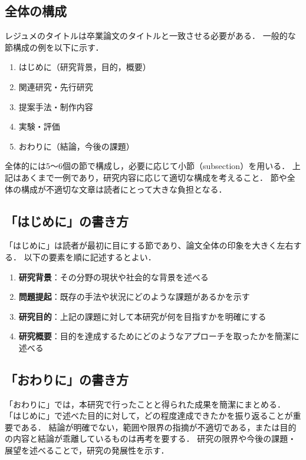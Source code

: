 \subsection{全体の構成}
\label{subsec:structure}
レジュメのタイトルは卒業論文のタイトルと一致させる必要がある．
一般的な節構成の例を以下に示す．
\begin{enumerate}
    \item はじめに（研究背景，目的，概要）
    \item 関連研究・先行研究
    \item 提案手法・制作内容
    \item 実験・評価
    \item おわりに（結論，今後の課題）
\end{enumerate}
全体的には5〜6個の節で構成し，必要に応じて小節（subsection）を用いる．
上記はあくまで一例であり，研究内容に応じて適切な構成を考えること．
節や全体の構成が不適切な文章は読者にとって大きな負担となる\cite{kisaragi}．

\subsection{「はじめに」の書き方}
\label{subsec:intro-writing}
「はじめに」は読者が最初に目にする節であり、論文全体の印象を大きく左右する．
以下の要素を順に記述するとよい．
\begin{enumerate}
    \item \textbf{研究背景}：その分野の現状や社会的な背景を述べる
    \item \textbf{問題提起}：既存の手法や状況にどのような課題があるかを示す
    \item \textbf{研究目的}：上記の課題に対して本研究が何を目指すかを明確にする
    \item \textbf{研究概要}：目的を達成するためにどのようなアプローチを取ったかを簡潔に述べる
\end{enumerate}

\subsection{「おわりに」の書き方}
\label{subsec:conclusion-writing}
「おわりに」では，本研究で行ったことと得られた成果を簡潔にまとめる．
「はじめに」で述べた目的に対して，どの程度達成できたかを振り返ることが重要である．
結論が明確でない，範囲や限界の指摘が不適切である，または目的の内容と結論が乖離しているものは再考を要する．
研究の限界や今後の課題・展望を述べることで，研究の発展性を示す．

